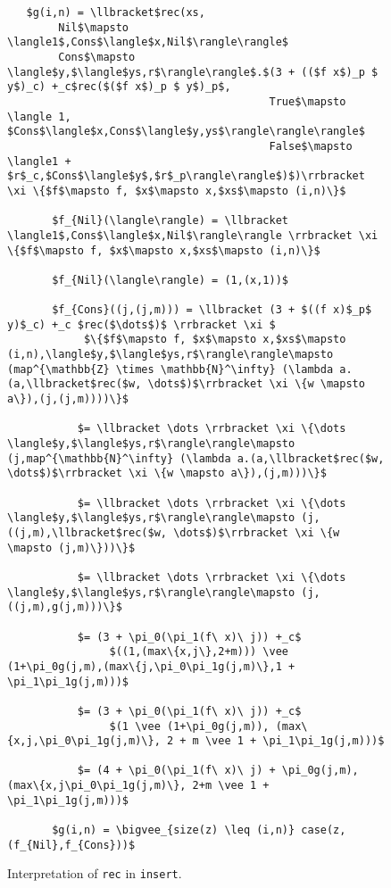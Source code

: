 \documentclass[12pt,letterpaper]{article}
\newcommand{\T}[1]{\texttt{#1}}
\begin{document}
\begin{figure}[H]
  \caption{Interpretation of \T{rec} in \T{insert}.}
  \label{fig:interp_sizes_outer_rec}
  \begin{lstlisting}
   $g(i,n) = \llbracket$rec(xs,
        Nil$\mapsto \langle1$,Cons$\langle$x,Nil$\rangle\rangle$
        Cons$\mapsto \langle$y,$\langle$ys,r$\rangle\rangle$.$(3 + (($f x$)_p $ y$)_c) +_c$rec($($f x$)_p $ y$)_p$,
                                         True$\mapsto \langle 1, $Cons$\langle$x,Cons$\langle$y,ys$\rangle\rangle\rangle$
                                         False$\mapsto \langle1 + $r$_c,$Cons$\langle$y$,$r$_p\rangle\rangle$)$)\rrbracket \xi \{$f$\mapsto f, $x$\mapsto x,$xs$\mapsto (i,n)\}$

       $f_{Nil}(\langle\rangle) = \llbracket \langle1$,Cons$\langle$x,Nil$\rangle\rangle \rrbracket \xi \{$f$\mapsto f, $x$\mapsto x,$xs$\mapsto (i,n)\}$

       $f_{Nil}(\langle\rangle) = (1,(x,1))$

       $f_{Cons}((j,(j,m))) = \llbracket (3 + $((f x)$_p$ y)$_c) +_c $rec($\dots$)$ \rrbracket \xi $
            $\{$f$\mapsto f, $x$\mapsto x,$xs$\mapsto (i,n),\langle$y,$\langle$ys,r$\rangle\rangle\mapsto (map^{\mathbb{Z} \times \mathbb{N}^\infty} (\lambda a.(a,\llbracket$rec($w, \dots$)$\rrbracket \xi \{w \mapsto a\}),(j,(j,m))))\}$

           $= \llbracket \dots \rrbracket \xi \{\dots \langle$y,$\langle$ys,r$\rangle\rangle\mapsto (j,map^{\mathbb{N}^\infty} (\lambda a.(a,\llbracket$rec($w, \dots$)$\rrbracket \xi \{w \mapsto a\}),(j,m)))\}$

           $= \llbracket \dots \rrbracket \xi \{\dots \langle$y,$\langle$ys,r$\rangle\rangle\mapsto (j,((j,m),\llbracket$rec($w, \dots$)$\rrbracket \xi \{w \mapsto (j,m)\}))\}$

           $= \llbracket \dots \rrbracket \xi \{\dots \langle$y,$\langle$ys,r$\rangle\rangle\mapsto (j,((j,m),g(j,m)))\}$

           $= (3 + \pi_0(\pi_1(f\ x)\ j)) +_c$
                $((1,(max\{x,j\},2+m))) \vee (1+\pi_0g(j,m),(max\{j,\pi_0\pi_1g(j,m)\},1 + \pi_1\pi_1g(j,m)))$

           $= (3 + \pi_0(\pi_1(f\ x)\ j)) +_c$
                $(1 \vee (1+\pi_0g(j,m)), (max\{x,j,\pi_0\pi_1g(j,m)\}, 2 + m \vee 1 + \pi_1\pi_1g(j,m)))$

           $= (4 + \pi_0(\pi_1(f\ x)\ j) + \pi_0g(j,m), (max\{x,j\pi_0\pi_1g(j,m)\}, 2+m \vee 1 + \pi_1\pi_1g(j,m)))$

       $g(i,n) = \bigvee_{size(z) \leq (i,n)} case(z, (f_{Nil},f_{Cons}))$
  \end{lstlisting}
\end{figure}
\end{document}
